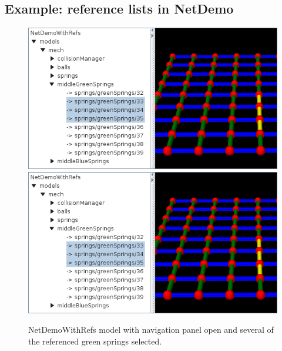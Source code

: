 \subsection{Example: reference lists in NetDemo}

\begin{figure}[ht]
\begin{center}
\iflatexml
 \includegraphics[]{images/NetDemoWithRefs}
\else
 \includegraphics[width=4.5in]{images/NetDemoWithRefs}
\fi
\end{center}
\caption{NetDemoWithRefs model with navigation panel open and
several of the referenced green springs selected.}
\label{NetDemoWithRefs:fig}
\end{figure}

